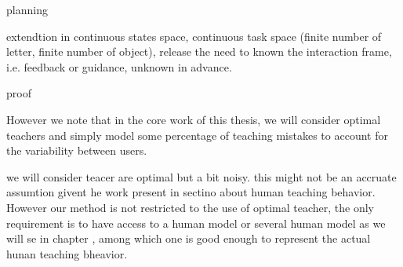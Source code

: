 planning

extendtion in continuous states space, continuous task space (finite number of letter, finite number of object), release the need to known the interaction frame, i.e. feedback or guidance, unknown in advance.

proof

However we note that in the core work of this thesis, we will consider optimal teachers and simply model some percentage of teaching mistakes to account for the variability between users.


we will consider teacer are optimal but a bit noisy. this might not be an accruate assumtion givent he work present in sectino about human teaching behavior. However our method is not restricted to the use of optimal teacher, the only requirement is to have access to a human model or several human model as we will se in chapter , among which one is good enough to represent the actual hunan teaching bheavior.

